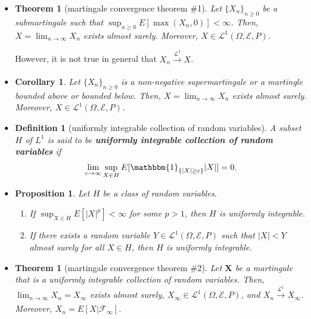 \documentclass[10pt]{article}
\newtheorem{theorem}[lemma]{Theorem}
\newtheorem{definition}[lemma]{Definition}
\newtheorem{proposition}[lemma]{Proposition}
\newtheorem{corollary}[lemma]{Corollary}
\numberwithin{lemma}{section}
\newcommand{\ve}[1]{\mathbf{#1}}
\newcommand{\mcal}[1]{\mathcal{#1}}
\newcommand{\one}{\mathbbm{1}}
\begin{document}
\begin{itemize}
  \item \begin{theorem}[martingale convergence theorem \#1]
    Let $\{X_n\}_{n \geq 0}$ be a submartingale such that $\sup_{n \geq 0} E[\max(X_n, 0)] < \infty$. Then, $X = \lim_{n \rightarrow \infty} X_n$ exists almost surely. Moreover, $X \in \mcal{L}^1(\Omega,\mcal{E},P)$.
  \end{theorem}
  However, it is not true in general that $X_n \xrightarrow[]{\mcal{L}^1} X$.

  \item \begin{corollary}
    Let $\{X_n\}_{n \geq 0}$ is a non-negative supermartingale or a martingle bounded above or bounded below. Then, $X = \lim_{n \rightarrow \infty} X_n$ exists almost surely. Moreover, $X \in \mcal{L}^1(\Omega,\mcal{E},P)$.
  \end{corollary}

  \item \begin{definition}[uniformly integrable collection of random variables]
    A subset $H$ of $L^1$ is said to be {\bf uniformly integrable collection of random variables} if
    \begin{align*}
      \lim_{c \rightarrow \infty} \sup_{X \in H} E[\one_{\{ |X| \geq c \}}|X|] = 0.
    \end{align*}
  \end{definition}

  \item \begin{proposition}
    Let $H$ be a class of random variables.
    \begin{enumerate}
      \item If $\sup_{X \in H} E[|X|^p] < \infty$ for some $p > 1$, then $H$ is uniformly integrable.
      \item If there exists a random variable $Y \in \mcal{L}^1(\Omega,\mcal{E},P)$ such that $|X| < Y$ almost surely for all $X \in H$, then $H$ is uniformly integrable. 
    \end{enumerate}
  \end{proposition}

  \item \begin{theorem}[martingale convergence theorem \#2]
    Let $\ve{X}$ be a martingale that is a uniformly integrable collection of random variables. Then, $\lim_{n \rightarrow \infty} X_n = X_\infty$ exists almost surely, $X_\infty \in \mcal{L}^1(\Omega, \mcal{E}, P)$, and $X_n \xrightarrow[]{\mcal{L}^1} X_\infty$. Moreover, $X_n = E[X|\mcal{F}_\infty]$.


\end{theorem}
\end{itemize}
\end{document}
